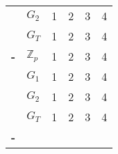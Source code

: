 \begin{longtabu}{| >{\bfseries\centering}p{2cm} | >{\bfseries\centering}p{0.5cm} | X[c] X[c] X[c] X[c] |}
	& $G_2$ \newline & 1 & 2 & 3 & 4 \\
	& $G_T$ \newline & 1 & 2 & 3 & 4 \\
	\tabucline[1pt]-
	 \newline & $\mathbb{Z}_p$ & 1 & 2 & 3 & 4 \\
	& $G_1$ \newline & 1 & 2 & 3 & 4 \\
	& $G_2$ \newline & 1 & 2 & 3 & 4 \\
	& $G_T$ \newline & 1 & 2 & 3 & 4 \\
	\tabucline[3pt]-
\end{longtabu}